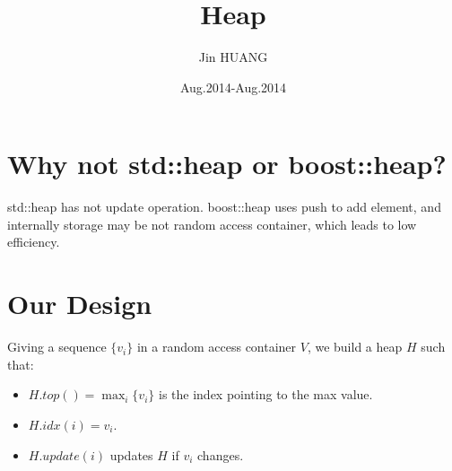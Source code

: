 \documentclass[9pt,twocolumn]{extarticle}
\title{Heap}
\author{Jin HUANG}
\date{Aug.2014-Aug.2014}
\begin{document}
\maketitle

\section{Why not std::heap or boost::heap?}
std::heap has not update operation.  boost::heap uses push to add
element, and internally storage may be not random access container,
which leads to low efficiency.

\section{Our Design}
Giving a sequence $\{v_i\}$ in a random access container $V$, we build
a heap $H$ such that:
\begin{itemize}
\item $H.top() = \max_i\{v_i\}$ is the index pointing to the max value.
\item $H.idx(i) = v_i$.
\item $H.update(i)$ updates $H$ if $v_i$ changes.
\end{itemize}
\end{document}
